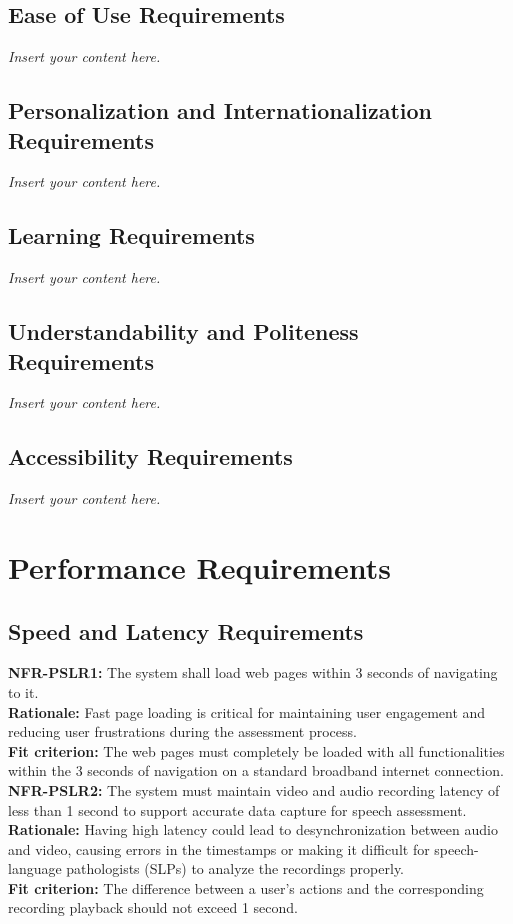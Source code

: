\documentclass[12pt]{article}
\newcommand{\lips}{\textit{Insert your content here.}}
\begin{document}
\subsection{Ease of Use Requirements}
\lips
\subsection{Personalization and Internationalization Requirements}
\lips
\subsection{Learning Requirements}
\lips
\subsection{Understandability and Politeness Requirements}
\lips
\subsection{Accessibility Requirements}
\lips

\section{Performance Requirements}
\subsection{Speed and Latency Requirements}
\noindent\textbf{NFR-PSLR1: }The system shall load web pages within 3 seconds of navigating to it.\\
\textbf{Rationale: }Fast page loading is critical for maintaining user engagement and reducing user frustrations during the assessment process.\\
\textbf{Fit criterion: }The web pages must completely be loaded with all functionalities within the 3 seconds of navigation on a standard broadband internet connection.\\

\noindent\textbf{NFR-PSLR2: }The system must maintain video and audio recording latency of less than 1 second to support accurate data capture for speech assessment.\\
\textbf{Rationale: }Having high latency could lead to desynchronization between audio and video, causing errors in the timestamps or making it difficult for speech-language pathologists (SLPs) to analyze the recordings properly.\\
\textbf{Fit criterion: }The difference between a user's actions and the corresponding recording playback should not exceed 1 second. \\
\end{document}
